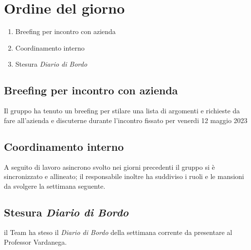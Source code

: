 \section{Ordine del giorno}
\begin{enumerate}
\item Breefing per incontro con azienda 
\item Coordinamento interno 
\item Stesura \textit{Diario di Bordo}
\end{enumerate}

\subsection{Breefing per incontro con azienda }
Il gruppo ha tenuto un breefing per stilare una lista di argomenti e richieste da fare all'azienda e discuterne durante l'incontro fissato per venerdi 12 maggio 2023
\subsection{Coordinamento interno}
A seguito di lavoro asincrono svolto nei giorni precedenti il gruppo si è sincronizzato e allineato; il responsabile inoltre ha suddiviso i ruoli e le mansioni da svolgere la settimana seguente. 
\subsection{Stesura \textit{Diario di Bordo}}
il Team ha steso il \textit{Diario di Bordo} della settimana corrente da presentare al Professor Vardanega.